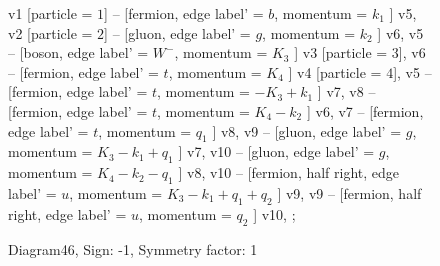 \documentclass{revtex4}
\begin{document}
\begin{figure}[!htb]
\begin{center}
{    %
v1 [particle = \(1\)] -- [fermion, edge label' = \(b\), momentum = \(k_{1}\) ] v5, 
v2 [particle = \(2\)] -- [gluon, edge label' = \(g\), momentum = \(k_{2}\) ] v6, 
v5 -- [boson, edge label' = \(W^{-}\), momentum = \(K_{3}\) ] v3 [particle = \(3\)], 
v6 -- [fermion, edge label' = \(t\), momentum = \(K_{4}\) ] v4 [particle = \(4\)], 
v5 -- [fermion, edge label' = \(t\), momentum = \(-K_{3} + k_{1}\) ] v7, 
v8 -- [fermion, edge label' = \(t\), momentum = \(K_{4} - k_{2}\) ] v6, 
v7 -- [fermion, edge label' = \(t\), momentum = \(q_{1}\) ] v8, 
v9 -- [gluon, edge label' = \(g\), momentum = \(K_{3} - k_{1} + q_{1}\) ] v7, 
v10 -- [gluon, edge label' = \(g\), momentum = \(K_{4} - k_{2} - q_{1}\) ] v8, 
v10 -- [fermion, half right, edge label' = \(u\), momentum = \(K_{3} - k_{1} + q_{1} + q_{2}\) ] v9, 
v9 -- [fermion, half right, edge label' = \(u\), momentum = \(q_{2}\) ] v10, 
};
\end{center}
\caption{Diagram46, Sign: -1, Symmetry factor: 1}
\end{figure}
\newpage
\end{document}

